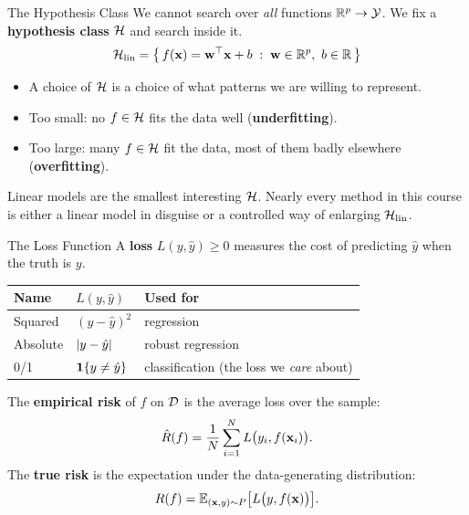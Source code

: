 \documentclass[11pt,aspectratio=169]{beamer}
\begin{document}
\begin{frame}{The Hypothesis Class}
We cannot search over \emph{all} functions $\mathbb{R}^p\to\mathcal{Y}$. We fix a \textbf{hypothesis class}
$\mathcal{H}$ and search inside it.
\[
\mathcal{H}_{\text{lin}}=\bigl\{\,f(\mathbf{x})=\mathbf{w}^{\top}\mathbf{x}+b \;:\; \mathbf{w}\in\mathbb{R}^p,\ b\in\mathbb{R}\,\bigr\}
\]
\begin{itemize}
  \item A choice of $\mathcal{H}$ is a choice of what patterns we are willing to represent.
  \item Too small: no $f\in\mathcal{H}$ fits the data well (\textbf{underfitting}).
  \item Too large: many $f\in\mathcal{H}$ fit the data, most of them badly elsewhere (\textbf{overfitting}).
\end{itemize}
\begin{keypoint}
Linear models are the smallest interesting $\mathcal{H}$. Nearly every method in this course is either
a linear model in disguise or a controlled way of enlarging $\mathcal{H}_{\text{lin}}$.
\end{keypoint}
\end{frame}

\begin{frame}{The Loss Function}
A \textbf{loss} $L(y,\hat y)\ge 0$ measures the cost of predicting $\hat y$ when the truth is $y$.
\begin{center}
\begin{tabular}{lll}
\toprule
Name & $L(y,\hat y)$ & Used for \\
\midrule
Squared & $(y-\hat y)^2$ & regression \\
Absolute & $\left\lvert y-\hat y \right\rvert$ & robust regression \\
0/1 & $\mathbf{1}\!\left\{y\neq\hat y\right\}$ & classification (the loss we \emph{care} about) \\
\bottomrule
\end{tabular}
\end{center}
\vspace{4pt}
The \textbf{empirical risk} of $f$ on $\mathcal{D}$ is the average loss over the sample:
\[
\hat R(f)=\frac1N\sum_{i=1}^N L\bigl(y_i,f(\mathbf{x}_i)\bigr).
\]
The \textbf{true risk} is the expectation under the data-generating distribution:
\[
R(f)=\mathbb{E}_{(\mathbf{x},y)\sim P}\bigl[L\bigl(y,f(\mathbf{x})\bigr)\bigr].
\]
\end{frame}
\end{document}
